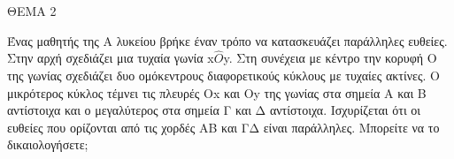 
ΘΕΜΑ 2

Ένας μαθητής της Α\textquotesingle{} λυκείου βρήκε έναν τρόπο να κατασκευάζει παράλληλες ευθείες. Στην αρχή σχεδιάζει μια τυχαία γωνία x$\widehat{Ο}$y. Στη συνέχεια με κέντρο την κορυφή Ο της γωνίας σχεδιάζει δυο ομόκεντρους διαφορετικούς κύκλους με τυχαίες ακτίνες. Ο μικρότερος κύκλος τέμνει τις πλευρές Οx και Οy της γωνίας στα σημεία Α και Β αντίστοιχα και ο μεγαλύτερος στα σημεία Γ και Δ αντίστοιχα. Ισχυρίζεται ότι οι ευθείες που ορίζονται από τις χορδές ΑΒ και ΓΔ είναι παράλληλες. Μπορείτε να το δικαιολογήσετε; 
